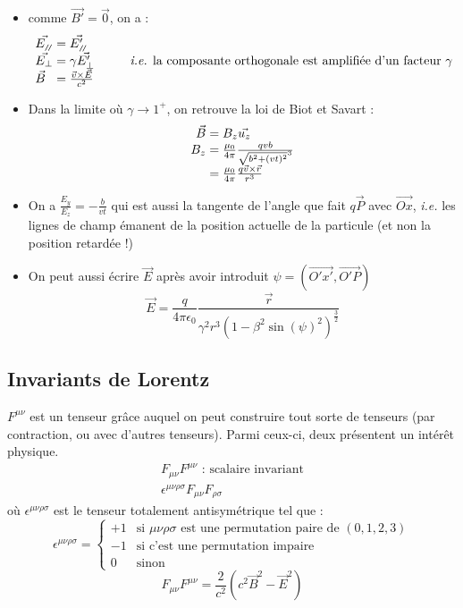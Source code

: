 \begin{remarks}\hspace{1pt}
	\begin{itemize}
		\item comme $\vec{B'}=\vec{0}$, on a :
		$$
			\begin{array}{l@{\;}l}
				\vec{E_{\para}}&=\vec{E'_{\para}}\\
				\vec{E_{\perp}}&=\gamma\vec{E'_{\perp}} \kern 1cm \text{\emph{i.e.} la composante orthogonale est amplifiée d'un facteur }\gamma\\
				\vec{B}&=\frac{\vec{v}\times\vec{E}}{c^2}
			\end{array}
		$$
		\item Dans la limite où $\gamma \longrightarrow 1^+$, on retrouve la loi de Biot et Savart :
		$$
			\begin{array}{r@{\;}l}
				\vec{B}&=B_z\vec{u_z}\\
				B_z&=\frac{\mu_0}{4\pi}\frac{qvb}{\sqrt{b^2+(vt)^2}^3}\\
					&=\frac{\mu_0}{4\pi}\frac{q\vec{v}\times\vec{r}}{r^3}
			\end{array}\\
		$$
		\item {\txt On a $\frac{E_y}{E_z}=-\frac{b}{vt}$ qui est aussi la tangente de l'angle que fait $q\vec{P}$ avec $\vec{Ox}$, \emph{i.e.} les lignes de champ émanent de la position actuelle de la particule (et non la position retardée !)}
		\item On peut aussi écrire $\vec{E}$ après avoir introduit $\psi=(\vec{O'x'},\vec{O'P})$
		$$
			\vec{E}=\frac{q}{4\pi\epsilon_0}\frac{\vec{r}}{\gamma^2r^3(1-\beta^2\sin(\psi)^2)^{\frac{3}{2}}}
		$$
	\end{itemize}
\end{remarks}

\subsection{Invariants de Lorentz}
$F^{\mu\nu}$ est un tenseur gr\^ace auquel on peut construire tout sorte de tenseurs (par contraction, ou avec d'autres tenseurs). Parmi ceux-ci, deux présentent un intér\^et physique.
$$
	\begin{array}{l}
		\boxed{F_{\mu\nu}F^{\mu\nu}}\text{ : scalaire invariant}\\
		\boxed{\epsilon^{\mu\nu\rho\sigma}F_{\mu\nu}F_{\rho\sigma}}
	\end{array}		
$$
où $\epsilon^{\mu\nu\rho\sigma}$ est le tenseur totalement antisymétrique tel que :
$$
	\epsilon^{\mu\nu\rho\sigma}=\begin{cases}
		+1&\text{si }\mu\nu\rho\sigma\text{ est une permutation paire de }(0,1,2,3)\\
		-1&\text{si c'est une permutation impaire}\\
		0&\text{sinon}
	\end{cases}
$$
$$
	F_{\mu\nu}F^{\mu\nu}=\frac{2}{c^2}(c^2\vec{B}^2-\vec{E}^2)
$$

